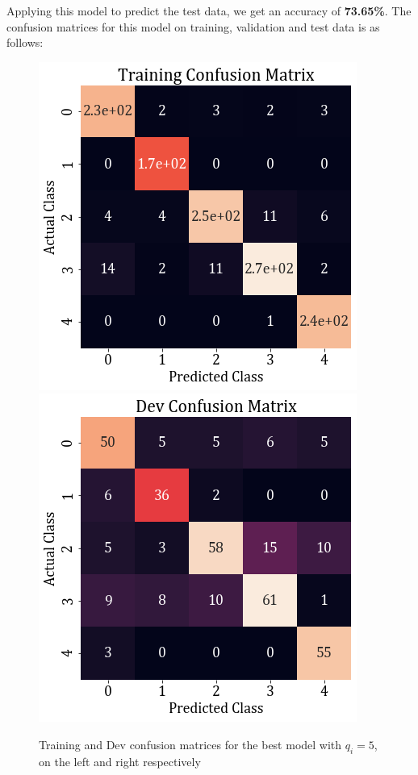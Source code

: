 \documentclass[11pt,a4paper]{article}
\begin{document}
Applying this model to predict the test data, we get an accuracy of \textbf{73.65\%}. The confusion matrices for this model on training, validation and test data is as follows:
\begin{figure}[H]
    \centering
    \includegraphics[scale=0.55]{images/2B/2B_diag_train_conf.png}
    \includegraphics[scale=0.55]{images/2B/2B_diag_dev_conf.png}
    \caption{Training and Dev confusion matrices for the best model with $q_i=5$, on the left and right respectively}
\end{figure}
\end{document}
